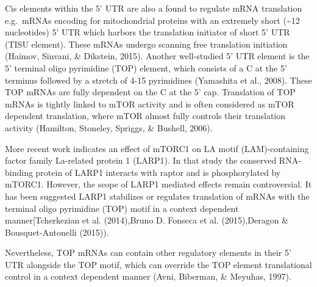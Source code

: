 \documentclass[
  12pt,
  openany]{book}
\begin{document}
Cis elements within the 5' UTR are also a found to regulate mRNA translation e.g.~mRNAs encoding for mitochondrial proteins with an extremely short (\textasciitilde12 nucleotides) 5' UTR which harbors the translation initiator of short 5' UTR (TISU element). These mRNAs undergo scanning free translation initiation (Haimov, Sinvani, \& Dikstein, 2015). Another well-studied 5' UTR element is the 5' terminal oligo pyrimidine (TOP) element, which consists of a C at the 5' terminus followed by a stretch of 4-15 pyrimidines (Yamashita et al., 2008). These TOP mRNAs are fully dependent on the C at the 5' cap. Translation of TOP mRNAs is tightly linked to mTOR activity and is often considered as mTOR dependent translation, where mTOR almost fully controls their translation activity (Hamilton, Stoneley, Spriggs, \& Bushell, 2006).

More recent work indicates an effect of mTORC1 on LA motif (LAM)-containing factor family La-related protein 1 (LARP1). In that study the conserved RNA-binding protein of LARP1 interacts with raptor and is phosphorylated by mTORC1. However, the scope of LARP1 mediated effects remain controversial. It has been suggested LARP1 stabilizes or regulates translation of mRNAs with the terminal oligo pyrimidine (TOP) motif in a context dependent manner{[}Tcherkezian et al. (2014),Bruno D. Fonseca et al. (2015),Deragon \& Bousquet-Antonelli (2015)).

Nevertheless, TOP mRNAs can contain other regulatory elements in their 5' UTR alongside the TOP motif, which can override the TOP element translational control in a context dependent manner (Avni, Biberman, \& Meyuhas, 1997).
\end{document}
